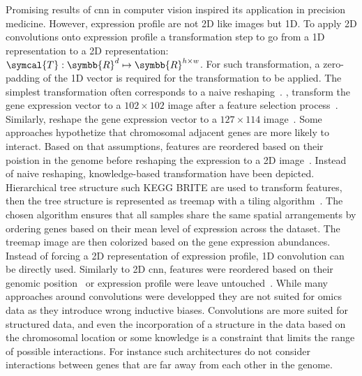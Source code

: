 \documentclass[../main.tex]{subfiles}
\begin{document}
	Promising results of \gls{cnn} in computer vision inspired its application in precision medicine.
	However, expression profile are not 2D like images but 1D.
	To apply 2D convolutions onto expression profile a transformation step to go from a 1D representation to a 2D representation: \(\symcal{T}: \symbb{R}^{d} \mapsto \symbb{R}^{h\times w}\).
	For such transformation, a zero-padding of the 1D vector is required for the transformation to be applied.
	The simplest transformation often corresponds to a naive reshaping~\cite{Wang2021,deGuia2019,Elbashir2019,Chatterjee2018}\@. \citeauthor{deGuia2019}, transform the gene expression vector to a \(102\times 102\) image after a feature selection process~\cite{deGuia2019}.
	Similarly, \citeauthor{Elbashir2019} reshape the gene expression vector to a \(127 \times 114\) image~\cite{Elbashir2019}.
	Some approaches hypothetize that chromosomal adjacent genes are more likely to interact.
	Based on that assumptions, features are reordered based on their poistion in the genome before reshaping the expression to a 2D image~\cite{Mostavi2020,Lyu2018,Yin2022}.
	Instead of naive reshaping, knowledge-based transformation have been depicted.
	Hierarchical tree structure such KEGG BRITE are used to transform features, then the tree structure is represented as treemap with a tiling algorithm~\cite{LpezGarca2020,maOmicsMapNetTransformingOmics2019}.
	The chosen algorithm ensures that all samples share the same spatial arrangements by ordering genes based on their mean level of expression across the dataset.
	The treemap image are then colorized based on the gene expression abundances.
	Instead of forcing a 2D representation of expression profile, 1D convolution can be directly used.
	Similarly to 2D \gls{cnn}, features were reordered based on their genomic position~\cite{Mostavi2020,Zhao2020,Yin2022} or expression profile were leave untouched~\cite{Mohammed2021}.
	While many approaches around convolutions were developped they are not suited for omics data as they introduce wrong inductive biases.
	Convolutions are more suited for structured data, and even the incorporation of a structure in the data based on the chromosomal location or some knowledge is a constraint that limits the range of possible interactions.
	For instance such architectures do not consider interactions between genes that are far away from each other in the genome.
\end{document}
